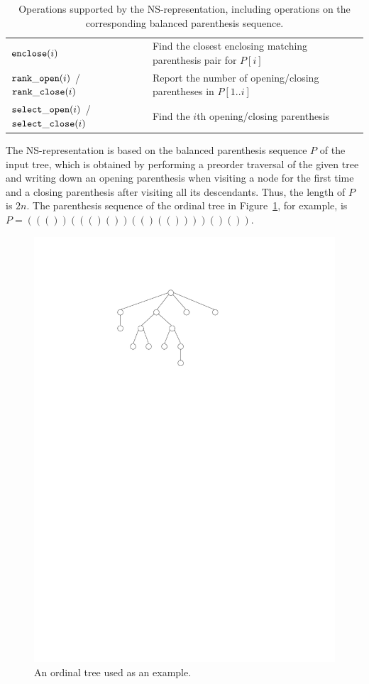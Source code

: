 \begin{table}[t]
\begin{center}
\begin{tabular}{|>{\raggedright}p{2.4cm}|>{\raggedright\arraybackslash}p{5.2cm}|}
$\mathtt{enclose}(i)$                         & Find the closest enclosing matching parenthesis pair for $P[i]$ \\
$\mathtt{rank\_open}(i)$ /$\mathtt{rank\_close}(i)$       & Report the number of opening/closing parentheses in $P[1..i]$\\
$\mathtt{select\_open}(i)$ /$\mathtt{select\_close}(i)$   & Find the $i$th opening/closing parenthesis\\ \hline
\end{tabular}
\caption{Operations supported by the NS-representation, including operations
  on the corresponding balanced parenthesis sequence.}
\label{tbl:operations}
\end{center}
\end{table}

The NS-representation is based on the balanced parenthesis sequence $P$ of
the input tree, which is obtained by performing a preorder traversal
of the given tree and writing down an opening parenthesis when visiting
a node for the first time and a closing parenthesis after visiting
all its descendants.
Thus, the length of $P$ is $2n$.
The parenthesis sequence of the ordinal tree in Figure~\ref{figure:bp}, for
example, is $P = ((())((()())(()(())))()())$.

\begin{figure}
  \centering
  \includegraphics[scale=0.5]{images/bp.pdf}
  \caption{An ordinal tree used as an example.}
  \label{figure:bp}
\end{figure}

